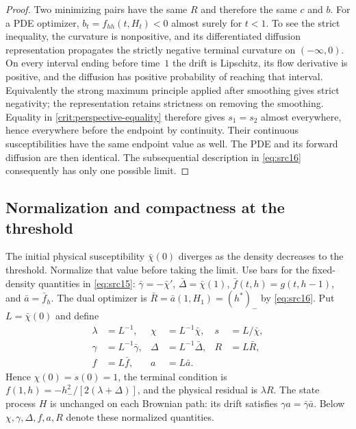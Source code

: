 \documentclass[11pt,a4paper]{article}
\numberwithin{equation}{section}
\theoremstyle{definition}
\theoremstyle{remark}
\begin{document}
\begin{proof}
Two minimizing pairs have the same $R$ and therefore the same $c$ and $b$.
For a PDE optimizer,
$b_t=f_{hh}(t,H_t)<0$ almost surely for $t<1$.  To see the strict inequality,
the curvature is nonpositive, and its differentiated diffusion
representation propagates the strictly negative terminal curvature on
$(-\infty,0)$.  On every interval ending before time~$1$ the drift is
Lipschitz, its flow derivative is positive, and the diffusion has positive
probability of reaching that interval.  Equivalently the strong maximum
principle applied after smoothing gives strict negativity; the
representation retains strictness on removing the smoothing.
Equality in \eqref{crit:perspective-equality} therefore gives
$s_1=s_2$ almost everywhere, hence everywhere before the endpoint by
continuity.  Their continuous susceptibilities have the same endpoint
value as well.  The PDE and its forward diffusion are then identical.
The subsequential description in \eqref{eq:src16} consequently has only
one possible limit.
\end{proof}

\subsection{Normalization and compactness at the threshold}

The initial physical susceptibility $\bar\chi(0)$ diverges as the
density decreases to the threshold. Normalize that value before taking
the limit.
Use bars for the fixed-density quantities in \eqref{eq:src15}:
$\bar\gamma=-\bar\chi'$, $\bar\Delta=\bar\chi(1)$,
$\bar f(t,h)=g(t,h-1)$, and $\bar a=\bar f_h$.
The dual optimizer is $\bar R=\bar a(1,H_1)=(h^*)_-$ by
\eqref{eq:src16}. Put $L=\bar\chi(0)$ and define
\[
 \begin{aligned}
 \lambda&=L^{-1},&\chi&=L^{-1}\bar\chi,&s&=L/\bar\chi,\\
 \gamma&=L^{-1}\bar\gamma,&\Delta&=L^{-1}\bar\Delta,&
 R&=L\bar R,\\
 f&=L\bar f,&a&=L\bar a.&&
 \end{aligned}
\]
Hence $\chi(0)=s(0)=1$, the terminal condition is
$f(1,h)=-h_-^2/[2(\lambda+\Delta)]$, and the physical residual is
$\lambda R$. The state process $H$ is unchanged on each Brownian path:
its drift satisfies $\gamma a=\bar\gamma\bar a$.
Below $\chi,\gamma,\Delta,f,a,R$ denote these normalized quantities.
\end{document}
